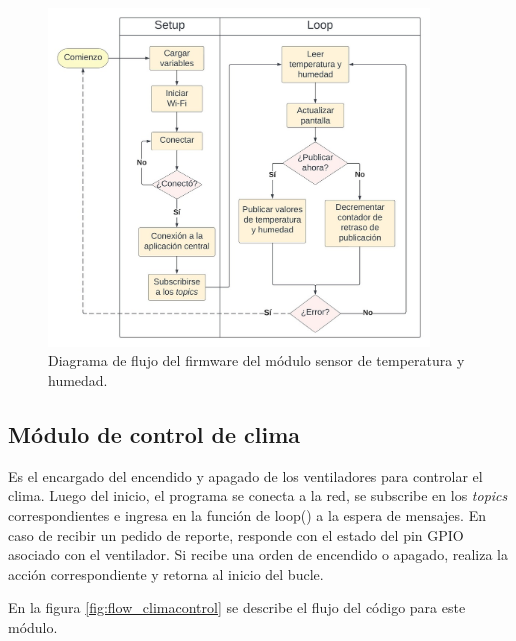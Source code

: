 \begin{figure}[!h]
	\centering
	\includegraphics[width=0.9\textwidth]{./Figures/chapter3/FirmwareTempSensor.jpg}
	\caption[Diagrama de flujo del firmware del módulo sensor de temperatura y humedad]{Diagrama de flujo del firmware del módulo sensor de temperatura y humedad.}
	\label{fig:flow_tempsensor}
\end{figure}

\pagebreak
\subsection{Módulo de control de clima}
\label{Módulo de control de clima}

Es el encargado del encendido y apagado de los ventiladores para controlar el clima.
Luego del inicio, el programa se conecta a la red, se subscribe en los \textit{topics} correspondientes e ingresa en la función de loop() a la espera de mensajes. En caso de recibir un pedido de reporte, responde con el estado del pin GPIO asociado con el ventilador. Si recibe una orden de encendido o apagado, realiza la acción correspondiente y retorna al inicio del bucle.

En la figura \ref{fig:flow_climacontrol} se describe el flujo del código para este módulo.

